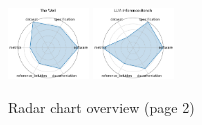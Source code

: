 \begin{figure}[ht!]
\includegraphics[width=0.1900\textwidth]{images/the_well_radar.pdf}
\includegraphics[width=0.1900\textwidth]{images/llm-inference-bench_radar.pdf}
\\[1ex]
\caption{Radar chart overview (page 2)}
\end{figure}


\clearpage

